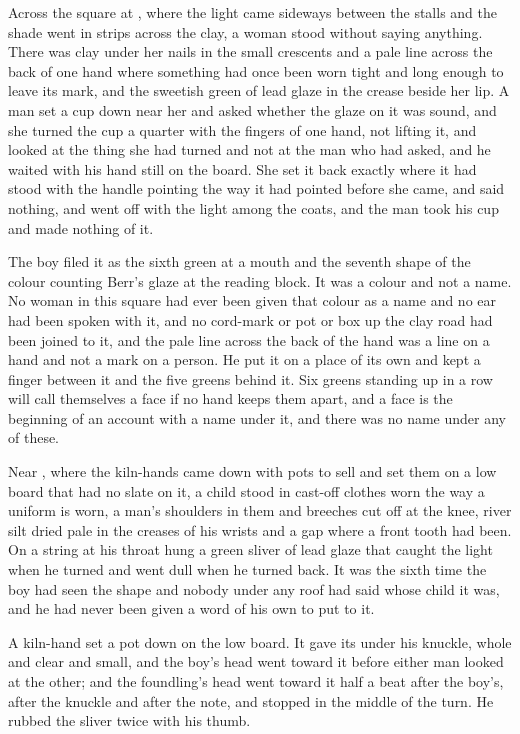 Across the square at , where the light came sideways between the stalls and the shade went in strips across the clay, a woman stood without saying anything. There was clay under her nails in the small crescents and a pale line across the back of one hand where something had once been worn tight and long enough to leave its mark, and the sweetish green of lead glaze in the crease beside her lip. A man set a cup down near her and asked whether the glaze on it was sound, and she turned the cup a quarter with the fingers of one hand, not lifting it, and looked at the thing she had turned and not at the man who had asked, and he waited with his hand still on the board. She set it back exactly where it had stood with the handle pointing the way it had pointed before she came, and said nothing, and went off with the light among the coats, and the man took his cup and made nothing of it.

The boy filed it as the sixth green at a mouth and the seventh shape of the colour counting Berr's glaze at the reading block. It was a colour and not a name. No woman in this square had ever been given that colour as a name and no ear had been spoken with it, and no cord-mark or pot or box up the clay road had been joined to it, and the pale line across the back of the hand was a line on a hand and not a mark on a person. He put it on a place of its own and kept a finger between it and the five greens behind it. Six greens standing up in a row will call themselves a face if no hand keeps them apart, and a face is the beginning of an account with a name under it, and there was no name under any of these.

\scenebreak

Near , where the kiln-hands came down with pots to sell and set them on a low board that had no slate on it, a child stood in cast-off clothes worn the way a uniform is worn, a man's shoulders in them and breeches cut off at the knee, river silt dried pale in the creases of his wrists and a gap where a front tooth had been. On a string at his throat hung a green sliver of lead glaze that caught the light when he turned and went dull when he turned back. It was the sixth time the boy had seen the shape and nobody under any roof had said whose child it was, and he had never been given a word of his own to put to it.

A kiln-hand set a pot down on the low board. It gave its  under his knuckle, whole and clear and small, and the boy's head went toward it before either man looked at the other; and the foundling's head went toward it half a beat after the boy's, after the knuckle and after the note, and stopped in the middle of the turn. He rubbed the sliver twice with his thumb.

